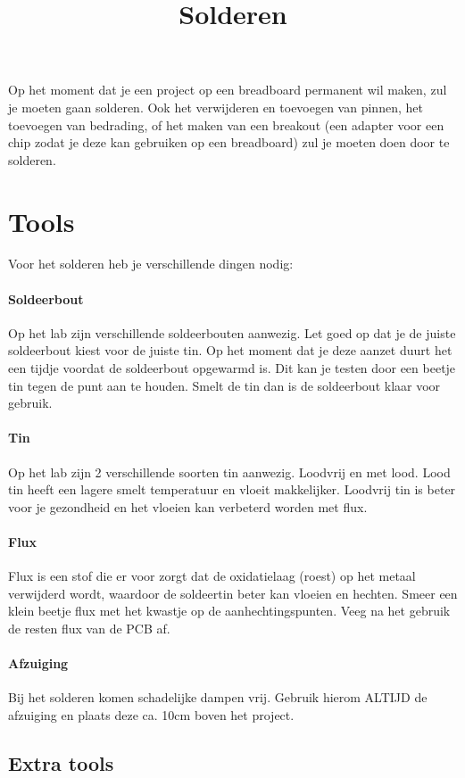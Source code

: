 \documentclass{guide}
\title{Solderen}
\begin{document}
Op het moment dat je een project op een breadboard permanent wil maken, zul je moeten gaan solderen. Ook het verwijderen en toevoegen van pinnen, het toevoegen van bedrading, of het maken van een breakout (een adapter voor een chip zodat je deze kan gebruiken op een breadboard) zul je moeten doen door te solderen.
\section{Tools}
Voor het solderen heb je verschillende dingen nodig:

\paragraph{Soldeerbout} Op het lab zijn verschillende soldeerbouten aanwezig. Let goed op dat je de juiste soldeerbout kiest voor de juiste tin. Op het moment dat je deze aanzet duurt het een tijdje voordat de soldeerbout opgewarmd is. Dit kan je testen door een beetje tin tegen de punt aan te houden. Smelt de tin dan is de soldeerbout klaar voor gebruik.

\paragraph{Tin} Op het lab zijn 2 verschillende soorten tin aanwezig. Loodvrij en met lood. Lood tin heeft een lagere smelt temperatuur en vloeit makkelijker. Loodvrij tin is beter voor je gezondheid en het vloeien kan verbeterd worden met flux.

\paragraph{Flux} Flux is een stof die er voor zorgt dat de oxidatielaag (roest) op het metaal verwijderd wordt, waardoor de soldeertin beter kan vloeien en hechten. Smeer een klein beetje flux met het kwastje op de aanhechtingspunten. Veeg na het gebruik de resten flux van de PCB af.

\paragraph{Afzuiging}
Bij het solderen komen schadelijke dampen vrij. Gebruik hierom ALTIJD de afzuiging en plaats deze ca. 10cm boven het project.
\subsection{Extra tools}
\end{document}
